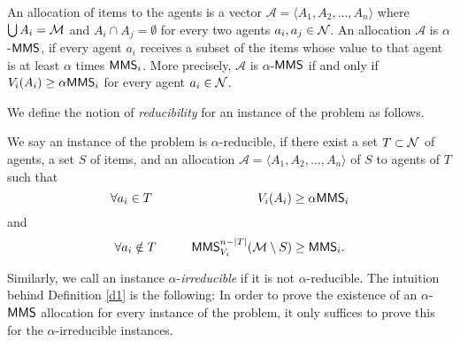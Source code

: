 
An allocation of items to the agents is a vector $\mathcal{A} = \langle A_1, A_2, \ldots, A_n\rangle$ where $\bigcup A_i = \mathcal{M}$ and $A_i \cap A_j = \emptyset$ for every two agents $a_i, a_j \in \mathcal{N}$. An allocation $\mathcal{A}$ is  $\alpha$-$\mathsf{MMS}$, if every agent $a_i$ receives a subset of the items whose value to that agent is at least $\alpha$ times $\mathsf{MMS}_i$. More precisely, $\mathcal{A}$ is $\alpha$-$\mathsf{MMS}$ if and only if
$V_i(A_i) \geq \alpha\mathsf{MMS}_i$
for every agent $a_i \in \mathcal{N}$.

We define the notion of \textit{reducibility} for an instance of the problem as follows.

\begin{definition}\label{d1}
	We say an instance of the problem is $\alpha$-reducible, if there exist a set $T \subset \mathcal{N}$ of agents, a set $S$ of items, and an allocation $\mathcal{A} = \langle A_1, A_2, \ldots, A_n\rangle$ of $S$ to agents of $T$ such that 
	$$\forall \agent_i \in T \hspace{3cm} V_i(A_i) \geq \alpha \MMS_i$$
	and
	$$\forall a_i \notin T \hspace{1cm} \mathsf{MMS}_{V_i}^{n-|T|} (\mathcal{M} \setminus S)\geq \mathsf{MMS}_i.$$
\end{definition}
Similarly, we call an instance $\alpha$-\textit{irreducible} if it is not $\alpha$-reducible. The intuition behind Definition \ref{d1} is the following: In order to prove the existence of an $\alpha$-$\mathsf{MMS}$ allocation for every instance of the problem, it only suffices to prove this for the $\alpha$-irreducible instances.

